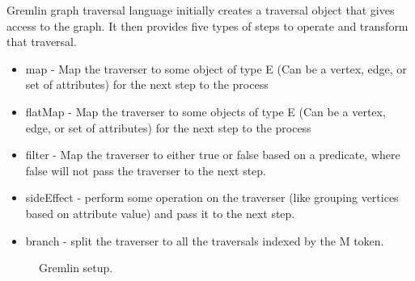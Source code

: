 Gremlin graph traversal language initially creates a traversal object that gives access to the graph. It then provides five types of steps to operate and transform that traversal. 

\begin{itemize}
\item map - Map the traverser to some object of type E (Can be a vertex, edge, or set of attributes) for the next step to the process
\item flatMap - Map the traverser to some objects of type E (Can be a vertex, edge, or set of attributes) for the next step to the process
\item filter - Map the traverser to either true or false based on a predicate, where false will not pass the traverser to the next step.
\item sideEffect - perform some operation on the traverser (like grouping vertices based on attribute value) and pass it to the next step. 
\item branch - split the traverser to all the traversals indexed by the M token.
\end{itemize}

\begin{figure}[t]
\centering
{}
\caption{Gremlin setup.}
\label{fig:gremlin}
\centering
\end{figure}


